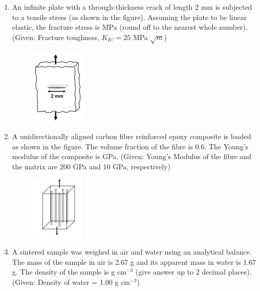 \documentclass[a4paper,10pt]{article}
\begin{document}
\begin{enumerate}
    \item An infinite plate with a through-thickness crack of length 2 mm is subjected to a tensile stress (as shown in the figure). Assuming the plate to be linear elastic, the fracture stress is \underline{\hspace{2cm}} MPa (round off to the nearest whole number).
    (Given: Fracture toughness, $K_{IC} = 25$ MPa $\sqrt{m}$)
    \begin{figure}[H] \centering \includegraphics[width=0.3\columnwidth]{q13_material_2018.png} \caption*{} \label{fig:q13_material_2018} \end{figure}
    \hfill{}

    \item A unidirectionally aligned carbon fibre reinforced epoxy composite is loaded as shown in the figure. The volume fraction of the fibre is 0.6. The Young's modulus of the composite is \underline{\hspace{2cm}} GPa.
    (Given: Young's Modulus of the fibre and the matrix are 200 GPa and 10 GPa, respectively)
    \begin{figure}[H] \centering \includegraphics[width=0.3\columnwidth]{q14_material_2018.png} \caption*{} \label{fig:q14_material_2018} \end{figure}
    \hfill{}

    \item A sintered sample was weighed in air and water using an analytical balance. The mass of the sample in air is 2.67 g and its apparent mass in water is 1.67 g. The density of the sample is \underline{\hspace{2cm}} g cm$^{-3}$ (give answer up to 2 decimal places).
    (Given: Density of water = 1.00 g cm$^{-3}$)
    \hfill{}


\end{enumerate}
\end{document}
